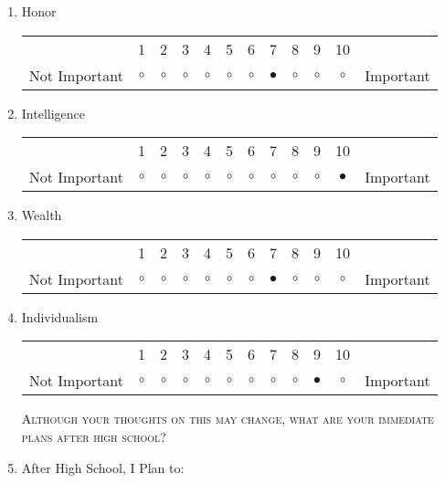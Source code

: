 \documentclass{article}
\begin{document}
\begin{enumerate}
\item Honor\\
\vspace{5pt}
\begin{tabular}{c c c c c c c c c c c c}
     & 1 & 2 & 3 & 4 & 5 & 6 & 7 & 8 & 9 & 10 & \\
    Not Important & $\circ$ & $\circ$ & $\circ$ & $\circ$ & $\circ$ & $\circ$ & $\bullet$ & $\circ$ & $\circ$ & $\circ$ & Important \\ 
\end{tabular}

\item Intelligence\\
\vspace{5pt}
\begin{tabular}{c c c c c c c c c c c c}
     & 1 & 2 & 3 & 4 & 5 & 6 & 7 & 8 & 9 & 10 & \\
    Not Important & $\circ$ & $\circ$ & $\circ$ & $\circ$ & $\circ$ & $\circ$ & $\circ$ & $\circ$ & $\circ$ & $\bullet$ & Important \\ 
\end{tabular}

\item Wealth\\
\vspace{5pt}
\begin{tabular}{c c c c c c c c c c c c}
     & 1 & 2 & 3 & 4 & 5 & 6 & 7 & 8 & 9 & 10 & \\
    Not Important & $\circ$ & $\circ$ & $\circ$ & $\circ$ & $\circ$ & $\circ$ & $\bullet$ & $\circ$ & $\circ$ & $\circ$ & Important \\ 
\end{tabular}

\item Individualism\\
\vspace{5pt}
\begin{tabular}{c c c c c c c c c c c c}
     & 1 & 2 & 3 & 4 & 5 & 6 & 7 & 8 & 9 & 10 & \\
    Not Important & $\circ$ & $\circ$ & $\circ$ & $\circ$ & $\circ$ & $\circ$ & $\circ$ & $\circ$ & $\bullet$ & $\circ$ & Important \\ 
\end{tabular}
\newpage

\textsc{Although your thoughts on this may change, what are your immediate plans after high school?}

\item After High School, I Plan to:\\


\end{enumerate}
\end{document}
